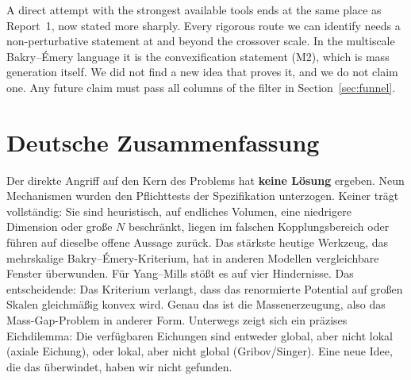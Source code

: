 \documentclass[11pt,a4paper]{article}
\begin{document}
A direct attempt with the strongest available tools ends at the same place as Report~1, now stated more sharply. Every rigorous route we can identify needs a non-perturbative statement at and beyond the crossover scale. In the multiscale Bakry--Émery language it is the convexification statement (M2), which is mass generation itself. We did not find a new idea that proves it, and we do not claim one. Any future claim must pass all columns of the filter in Section~\ref{sec:funnel}.

\appendix
\section{Deutsche Zusammenfassung}
Der direkte Angriff auf den Kern des Problems hat \textbf{keine Lösung} ergeben. Neun Mechanismen wurden den Pflichttests der Spezifikation unterzogen. Keiner trägt vollständig: Sie sind heuristisch, auf endliches Volumen, eine niedrigere Dimension oder große $N$ beschränkt, liegen im falschen Kopplungsbereich oder führen auf dieselbe offene Aussage zurück. Das stärkste heutige Werkzeug, das mehrskalige Bakry--Émery-Kriterium, hat in anderen Modellen vergleichbare Fenster überwunden. Für Yang--Mills stößt es auf vier Hindernisse. Das entscheidende: Das Kriterium verlangt, dass das renormierte Potential auf großen Skalen gleichmäßig konvex wird. Genau das ist die Massenerzeugung, also das Mass-Gap-Problem in anderer Form. Unterwegs zeigt sich ein präzises Eichdilemma: Die verfügbaren Eichungen sind entweder global, aber nicht lokal (axiale Eichung), oder lokal, aber nicht global (Gribov/Singer). Eine neue Idee, die das überwindet, haben wir nicht gefunden.
\end{document}
